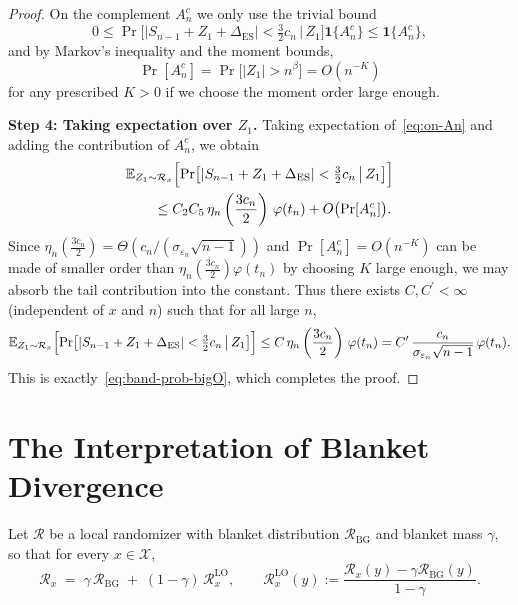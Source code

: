 \documentclass{article}
\theoremstyle{plain}
\theoremstyle{definition}
\begin{document}
\begin{proof}
On the complement $A_n^c$ we only use the trivial bound
\[
  0
  \le
  \Pr\bigl[
    |S_{n-1} + Z_1 + \Delta_{\mathrm{ES}}|
    < \tfrac{3}{2}c_n
    \,\big|\,
    Z_1
  \bigr]\mathbf 1\{A_n^c\}
  \le \mathbf 1\{A_n^c\},
\]
and by Markov's inequality and the moment bounds,
\[
  \Pr[A_n^c]
  = \Pr\bigl[|Z_1|>n^\beta\bigr]
  = O(n^{-K})
\]
for any prescribed $K>0$ if we choose the moment order large enough.

\medskip

\noindent
\textbf{Step 4: Taking expectation over $Z_1$.}
Taking expectation of~\eqref{eq:on-An} and adding the contribution of
$A_n^c$, we obtain
\begin{align*}
  &\mathbb E_{Z_1\sim\mathcal R_x}\Bigl[
    \Pr\bigl[
      |S_{n-1} + Z_1 + \Delta_{\mathrm{ES}}|
      < \tfrac{3}{2}c_n
      \,\big|\,
      Z_1
    \bigr]
  \Bigr] \\
  &\qquad\le
  C_2C_5\,\eta_n\left(\frac{3 c_n}{2}\right)\,\varphi(t_n)
  + O\bigl(\Pr[A_n^c]\bigr).
\end{align*}
Since $\eta_n\left(\frac{3 c_n}{2}\right) = \Theta(c_n/(\sigma_{\varepsilon_n}\sqrt{n-1}))$ and
$\Pr[A_n^c]=O(n^{-K})$ can be made of smaller order than
$\eta_n\left(\frac{3 c_n}{2}\right)\varphi(t_n)$ by choosing $K$ large enough, we may absorb
the tail contribution into the constant.
Thus there exists $C,C^\prime<\infty$ (independent of $x$ and $n$) such that
for all large $n$,
\[
  \mathbb E_{Z_1\sim\mathcal R_x}\Bigl[
    \Pr\bigl[
      |S_{n-1} + Z_1 + \Delta_{\mathrm{ES}}|
      < \tfrac{3}{2}c_n
      \,\big|\,
      Z_1
    \bigr]
  \Bigr]
  \le
  C\,\eta_n\left(\frac{3 c_n}{2}\right)\,\varphi(t_n)
  =
  C^\prime\,\frac{c_n}{\sigma_{\varepsilon_n}\sqrt{n-1}}\,
  \varphi(t_n).
\]
This is exactly~\eqref{eq:band-prob-bigO}, which completes the proof.
\end{proof}




\section{The Interpretation of Blanket Divergence}
\label{sec:interepretation-blanket-divergence}


Let $\mathcal R$ be a local randomizer with blanket distribution
$\mathcal R_{\mathrm{BG}}$ and blanket mass $\gamma$, so that for every
$x\in\mathcal X$,
\[
\mathcal R_x \;=\; \gamma\,\mathcal R_{\mathrm{BG}} \;+\; (1-\gamma)\,\mathcal R_x^{\mathrm{LO}},
\qquad
\mathcal R_x^{\mathrm{LO}}(y):=\frac{\mathcal R_x(y)-\gamma\mathcal R_{\mathrm{BG}}(y)}{1-\gamma}.
\]
\end{document}
